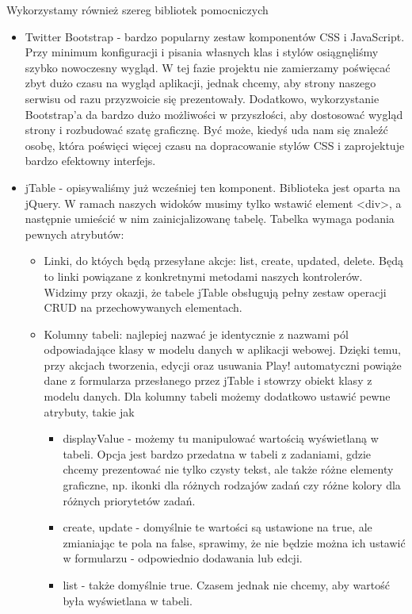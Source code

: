 \documentclass[a4paper,12pt,notitlepage]{mwrep}
\begin{document}
Wykorzystamy również szereg bibliotek pomocniczych
\begin{itemize}
	\item	Twitter Bootstrap - bardzo popularny zestaw komponentów CSS i JavaScript. Przy minimum konfiguracji i pisania własnych 
		klas i stylów osiągnęliśmy szybko nowoczesny wygląd. W tej fazie projektu nie zamierzamy poświęcać zbyt dużo czasu 
		na wygląd aplikacji, jednak chcemy, aby strony naszego serwisu od razu przyzwoicie się prezentowały. Dodatkowo, wykorzystanie 
		Bootstrap'a da bardzo dużo możliwości w przyszłości, aby dostosować wygląd strony i rozbudować szatę graficznę. Być może, kiedyś 
		uda nam się znaleźć osobę, która poświęci więcej czasu na dopracowanie stylów CSS i zaprojektuje bardzo efektowny interfejs.
	\item	jTable - opisywaliśmy już wcześniej ten komponent. Biblioteka jest oparta na jQuery. W ramach naszych widoków musimy tylko 
		wstawić element <div>, a następnie umieścić w nim zainicjalizowanę tabelę. Tabelka wymaga podania pewnych atrybutów:
		\begin{itemize}
			\item	Linki, do któych będą przesyłane akcje: list, create, updated, delete. Będą to linki powiązane z konkretnymi 
				metodami naszych kontrolerów. Widzimy przy okazji, że tabele jTable obsługują pełny zestaw operacji CRUD 
				na przechowywanych elementach.
			\item	Kolumny tabeli: najlepiej nazwać je identycznie z nazwami pól odpowiadające klasy w modelu danych w aplikacji 
				webowej. Dzięki temu, przy akcjach tworzenia, edycji oraz usuwania Play! automatyczni powiąże dane z formularza 
				przesłanego przez jTable i stowrzy obiekt klasy z modelu danych. Dla kolumny tabeli możemy dodatkowo ustawić 
				pewne atrybuty, takie jak
				\begin{itemize}
					\item	displayValue - możemy tu manipulować wartością wyświetlaną w tabeli. Opcja jest bardzo przedatna 
						w tabeli z zadaniami, gdzie chcemy prezentować nie tylko czysty tekst, ale także różne 
						elementy graficzne, np. ikonki dla różnych rodzajów zadań czy różne kolory dla różnych priorytetów 
						zadań.
					\item	create, update - domyślnie te wartości są ustawione na true, ale zmianiając te pola na false, 
						sprawimy, że nie będzie można ich ustawić w formularzu - odpowiednio dodawania lub edcji.
					\item	list - także domyślnie true. Czasem jednak nie chcemy, aby wartość była wyświetlana w tabeli.

\end{itemize}
\end{itemize}
\end{itemize}
\end{document}
